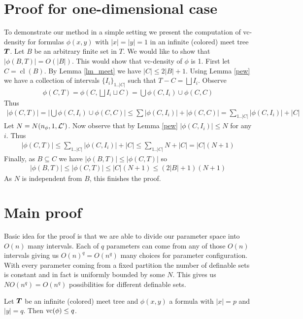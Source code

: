 \documentclass{amsart}
\DeclareMathOperator{\TT}{\boldface T}
\DeclareMathOperator{\cl}{cl}
\begin{document}
\section{Proof for one-dimensional case}

To demonstrate our method in a simple setting we present the computation of vc-density for formulas $\phi(x, y)$ with $|x| = |y| = 1$ in an infinite (colored) meet tree $\TT$. Let $B$ be an arbitrary finite set in $T$. We would like to show that $|\phi(B, T)| = O(|B|)$. This would show that vc-density of $\phi$ is 1. First let $C = \cl(B)$. By Lemma \ref{lm_meet} we have $|C| \leq 2|B| + 1$. Using Lemma \ref{pew} we have a collection of intervals $\{I_i\}_{1..|C|}$ such that $T - C = \bigsqcup I_i$. Observe
\begin{align*}
	\phi(C,T) = \phi(C, \bigsqcup I_i \sqcup C) = \bigcup \phi(C, I_i) \cup \phi(C, C)
\end{align*}
Thus
\begin{align*}
 |\phi(C,T)| = \left|\bigcup \phi(C, I_i) \cup \phi(C, C)\right| \leq \sum |\phi(C, I_i)| + |\phi(C, C)| = \sum_{1..|C|} |\phi(C, I_i)| + |C|
\end{align*}
Let $N = N(n_\phi, 1, \mathcal L')$. Now observe that by Lemma \ref{pew} $|\phi(C, I_i)| \leq N$ for any $i$. Thus
\begin{align*}
	|\phi(C,T)| \leq \sum_{1..|C|} |\phi(C, I_i)| + |C| \leq \sum_{1..|C|} N + |C| = |C|(N+1)
\end{align*}
Finally, as $B \subseteq C$ we have $|\phi(B,T)| \leq |\phi(C,T)|$ so
\begin{align*}
	|\phi(B,T)| \leq |\phi(C,T)| \leq |C|(N+1) \leq (2|B| + 1)(N + 1)
\end{align*}
As $N$ is independent from $B$, this finishes the proof.

\section{Main proof}

Basic idea for the proof is that we are able to divide our parameter space into $O(n)$ many intervals. Each of $q$ parameters can come from any of those $O(n)$ intervals giving us $O(n)^q = O(n^q)$ many choices for parameter configuration. With every parameter coming from a fixed partition the number of definable sets is constant and in fact is uniformly bounded by some $N$. This gives us $N O(n^q) = O(n^q)$ possibilities for different definable sets.

\begin{Theorem}
	Let $\TT$ be an infinite (colored) meet tree and $\phi(x, y)$ a formula with $|x| = p$ and $|y| = q$. Then $\operatorname{vc}(\phi) \leq q$.
\end{Theorem}
\end{document}
